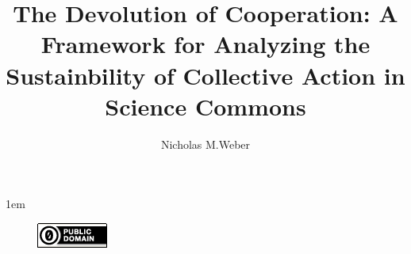 \documentclass[thesis,tocnosub,noragright,centerchapter,12pt]{uiucecethesis09}
\title{The Devolution of Cooperation: A Framework for Analyzing the Sustainbility of Collective Action in Science Commons}
\author{Nicholas M.Weber}
\begin{document}
%

%
\maketitle

\parindent 1em%

\frontmatter

%
\begin{abstract}

\end{abstract}


%
\begin{dedication}

\begin{figure}
\centering
\includegraphics{cc0}
\end{figure}
\end{dedication}

%
\begin{acknowledgments}

\end{acknowledgments}

%
\tableofcontents

%
\listoftables

%
\listoffigures
\end{document}
